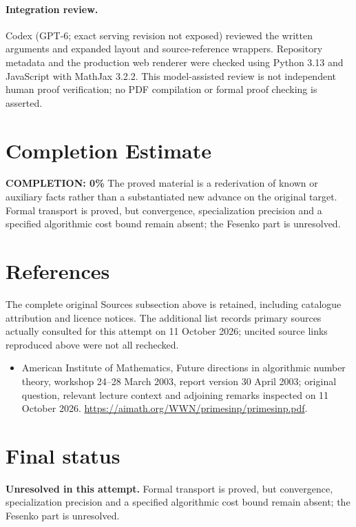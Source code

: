 \documentclass[11pt]{article}
\begin{document}
\paragraph{Integration review.} Codex (GPT-6; exact serving revision not exposed) reviewed the written arguments and expanded layout and source-reference wrappers. Repository metadata and the production web renderer were checked using Python 3.13 and JavaScript with MathJax 3.2.2. This model-assisted review is not independent human proof verification; no PDF compilation or formal proof checking is asserted.

\section{Completion Estimate}
\noindent\textbf{COMPLETION: 0\%}
The proved material is a rederivation of known or auxiliary facts rather than a substantiated new advance on the original target. Formal transport is proved, but convergence, specialization precision and a specified algorithmic cost bound remain absent; the Fesenko part is unresolved.
\section{References}
The complete original Sources subsection above is retained, including catalogue attribution and licence notices. The additional list records primary sources actually consulted for this attempt on 11 October 2026; uncited source links reproduced above were not all rechecked.
\begin{itemize}
\item American Institute of Mathematics, Future directions in algorithmic number theory, workshop 24--28 March 2003, report version 30 April 2003; original question, relevant lecture context and adjoining remarks inspected on 11 October 2026. \url{https://aimath.org/WWN/primesinp/primesinp.pdf}.
\end{itemize}
\section{Final status}
\textbf{Unresolved in this attempt.} Formal transport is proved, but convergence, specialization precision and a specified algorithmic cost bound remain absent; the Fesenko part is unresolved.
\end{document}
